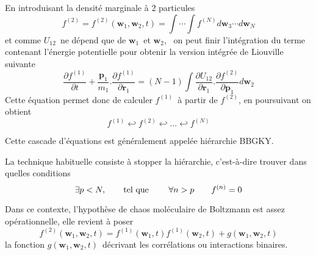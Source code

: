 {En introduisant la densit\'{e} marginale \`{a} 2 particules }
\[
f^{(2)}=f^{(2)}(\mathbf{w}_{1},\mathbf{w}_{2},t)=\int\cdots\int f^{(N)}%
d\mathbf{w}_{3}\cdots d\mathbf{w}_{N}
\]
{et comme }$U_{12}${\ ne d\'{e}pend que de }$\mathbf{w}_{1}${\ et }%
$\mathbf{w}_{2}$, {\ on peut finir l'int\'{e}gration du terme contenant
l'\'{e}nergie {potentiel}le pour obtenir la version int\'{e}gr\'{e}e de
{Liouville} sui\-van\-te}
\begin{equation}
\frac{\partial f^{(1)}}{\partial t}+\dfrac{\mathbf{p}_{1}}{m_{1}}%
.\dfrac{\partial f^{(1)}}{\partial\mathbf{r}_{1}}=\left(  N-1\right)
\displaystyle \int\dfrac{\partial U_{12}}{\partial\mathbf{r}_{1}}%
.\dfrac{\partial f^{(2)}}{\partial\mathbf{p}_{1}}d\mathbf{w}_{2}%
\label{liouint}%
\end{equation}
{Cette \'{e}quation permet donc de calculer }$f^{(1)}${\ \`{a} partir de
}$f^{(2)}${, en poursuivant on obtient }
\[
f^{(1)}\hookleftarrow f^{(2)}\hookleftarrow...\hookleftarrow f^{(N)}
\]


{\noindent Cette cascade d'\'{e}quations est g\'{e}n\'{e}ralement appel\'{e}e
hi\'{e}rarchie {BBGKY}.}

{La technique habituelle consiste \`{a} stopper la hi\'{e}rarchie,
c'est-\`{a}-dire trouver dans quelles conditions }
\[
\exists p<N,\qquad\text{tel que \qquad}\forall n>p\qquad f^{\left(  n\right)
}=0
\]


{Dans ce contexte, l'hypoth\`{e}se de chaos mol\'{e}culaire de {Boltzmann} est
assez op\'{e}rationnelle, elle revient \`{a} poser}
\[
f^{(2)}(\mathbf{w}_{1},\mathbf{w}_{2},t)=f^{(1)}(\mathbf{w}_{1},t)f^{(1)}%
(\mathbf{w}_{2},t)+g(\mathbf{w}_{1},\mathbf{w}_{2},t)
\]
{la fonction }$g(\mathbf{w}_{1},\mathbf{w}_{2},t)${\ d\'{e}crivant les
corr\'{e}lations ou interactions binaires.}

